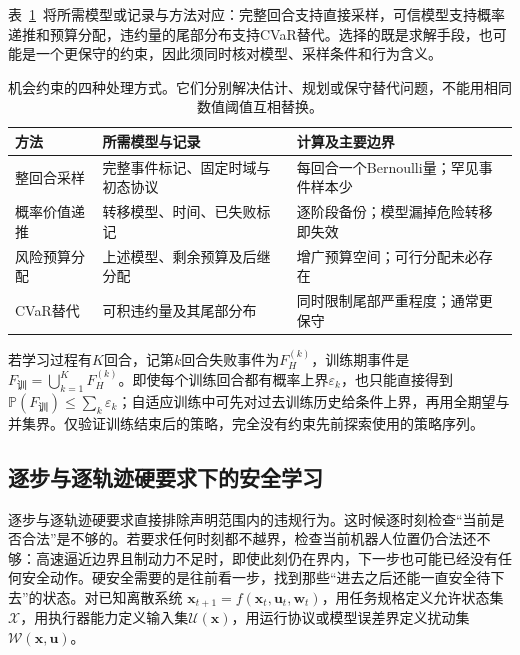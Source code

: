 表~\ref{tab:rl-trustworthy-chance-methods}~将所需模型或记录与方法对应：完整回合支持直接采样，可信模型支持概率递推和预算分配，违约量的尾部分布支持CVaR替代。选择的既是求解手段，也可能是一个更保守的约束，因此须同时核对模型、采样条件和行为含义。

\begin{table}[htbp]
  \centering
  \begin{tabularx}{\linewidth}{@{}>{\raggedright\arraybackslash}p{21mm}XX@{}}
    \toprule
    方法 & 所需模型与记录 & 计算及主要边界 \\
    \midrule
    整回合采样 & 完整事件标记、固定时域与初态协议 & 每回合一个Bernoulli量；罕见事件样本少 \\
    概率价值递推 & 转移模型、时间、已失败标记 & 逐阶段备份；模型漏掉危险转移即失效 \\
    风险预算分配 & 上述模型、剩余预算及后继分配 & 增广预算空间；可行分配未必存在 \\
    CVaR替代 & 可积违约量及其尾部分布 & 同时限制尾部严重程度；通常更保守 \\
    \bottomrule
  \end{tabularx}
  \caption{机会约束的四种处理方式。它们分别解决估计、规划或保守替代问题，不能用相同数值阈值互相替换。}
  \label{tab:rl-trustworthy-chance-methods}
\end{table}

\begin{samepage}
若学习过程有$K$回合，记第$k$回合失败事件为$F_H^{(k)}$，训练期事件是
$F_{\text{训}}=\bigcup_{k=1}^KF_H^{(k)}$。即使每个训练回合都有概率上界$\varepsilon_k$，也只能直接得到
$\mathbb P(F_{\text{训}})\leq\sum_k\varepsilon_k$；自适应训练中可先对过去训练历史给条件上界，再用全期望与并集界。仅验证训练结束后的策略，完全没有约束先前探索使用的策略序列。
\par
\end{samepage}

\subsection{逐步与逐轨迹硬要求下的安全学习}
\label{sec:rl-trustworthy-hard-safety}

逐步与逐轨迹硬要求直接排除声明范围内的违规行为。这时候逐时刻检查“当前是否合法”是不够的。若要求任何时刻都不越界，检查当前机器人位置仍合法还不够：高速逼近边界且制动力不足时，即使此刻仍在界内，下一步也可能已经没有任何安全动作。硬安全需要的是往前看一步，找到那些“进去之后还能一直安全待下去”的状态。对已知离散系统
$\bm{x}_{t+1}=f(\bm{x}_t,\bm{u}_t,\bm{w}_t)$，用任务规格定义允许状态集$\mathcal X$，用执行器能力定义输入集$\mathcal U(\bm{x})$，用运行协议或模型误差界定义扰动集$\mathcal W(\bm{x},\bm{u})$。

